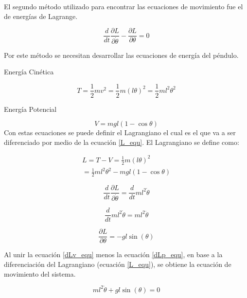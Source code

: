 El segundo método utilizado para encontrar las ecuaciones de movimiento fue el de energías de Lagrange.
\begin{large}
\begin{equation} \label{L_equ}
\dfrac{d}{dt} \dfrac{\partial L}{\partial \dot{\theta}} - \dfrac{\partial L}{\partial\theta} = 0
\end{equation}
\end{large}
Por este método se necesitan desarrollar las ecuaciones de energía del péndulo.\\
\begin{flushleft}
{\large Energía Cinética}
\end{flushleft}
\begin{equation} \label{T_equ}
T = \frac{1}{2}mv^2 = \frac{1}{2}m(l\theta)^2 = \frac{1}{2}ml^2\theta^2 
\end{equation}
\begin{flushleft}
{\large Energía Potencial}
\end{flushleft}
\begin{equation} \label{V_equ}
V = mgl(1-\cos \theta)
\end{equation}
Con estas ecuaciones se puede definir el Lagrangiano el cual es el que va a ser diferenciado por medio de la ecuación \ref{L_equ}. El Lagrangiano se define como:

\begin{large}
\begin{align*}
L = T - V = \frac{1}{2}m(l\theta)^2 \\
= \frac{1}{2}ml^2\theta^2 - mgl(1-\cos \theta)
\end{align*}
\end{large}

\begin{large}
\begin{equation*}
\dfrac{d}{dt} \dfrac{\partial L}{\partial \dot{\theta}} = \dfrac{d}{dt} ml^2\dot{\theta}
\end{equation*}
\end{large}
\begin{large}
\begin{equation} \label{dLv_equ}
\dfrac{d}{dt} ml^2\dot{\theta} = ml^2\ddot{\theta}
\end{equation}
\end{large}
\begin{large}
\begin{equation} \label{dLp_equ}
\dfrac{\partial L}{\partial\theta} = -gl\sin(\theta)
\end{equation}
\end{large}
Al unir la ecuación \ref{dLv_equ} menos la ecuación \ref{dLp_equ}, en base a la diferenciación del Lagrangiano (ecuación \ref{L_equ}), se obtiene la ecuación de movimiento del sistema.
\begin{large}
\begin{equation}
ml^2\ddot{\theta} + gl\sin(\theta) = 0
\end{equation}
\end{large}
